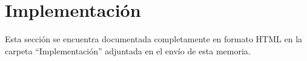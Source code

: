 \newpage
\section{Implementación}

Esta sección se encuentra documentada completamente en formato HTML en la carpeta ``Implementación'' adjuntada en el envío de esta memoria.\\
